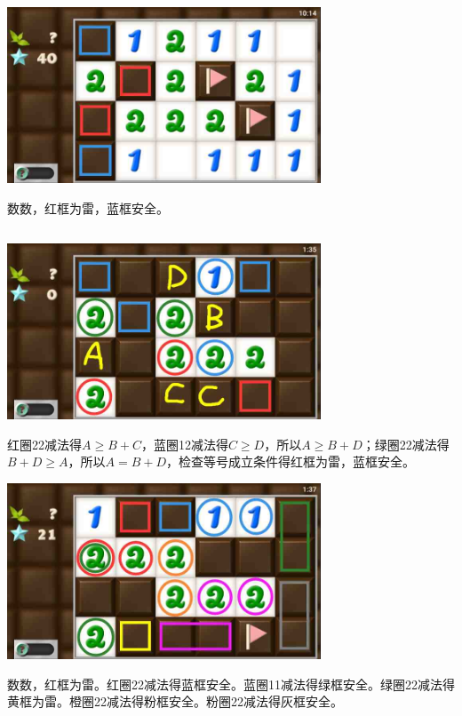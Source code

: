\begin{center}
    \includegraphics[width=0.7\textwidth]{puzzlelow/201-4.jpg}
\end{center}
数数，红框为雷，蓝框安全。

\subsection{} %
\begin{center}
    \includegraphics[width=0.7\textwidth]{puzzlelow/202-1.jpg}
\end{center}
红圈22减法得$A\ge B+C$，蓝圈12减法得$C\ge D$，所以$A\ge B+D$；绿圈22减法得$B+D\ge A$，所以$A=B+D$，检查等号成立条件得红框为雷，蓝框安全。
\begin{center}
    \includegraphics[width=0.7\textwidth]{puzzlelow/202-2.jpg}
\end{center}
数数，红框为雷。红圈22减法得蓝框安全。蓝圈11减法得绿框安全。绿圈22减法得黄框为雷。橙圈22减法得粉框安全。粉圈22减法得灰框安全。

